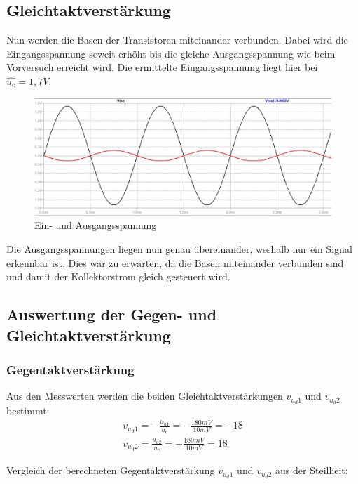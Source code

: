 \documentclass{article}
\begin{document}
\subsection{Gleichtaktverstärkung}
Nun werden die Basen der Transistoren miteinander verbunden. Dabei wird die Eingangsspannung soweit erhöht bis die gleiche Ausgangsspannung wie beim Vorversuch erreicht wird.
Die ermittelte Eingangsspannung liegt hier bei $\hat{u_e} = 1,7V$.

\begin{figure}[h]
  \begin{center}
    \includegraphics[scale=0.5]{../assets/images/EL2P1/Messung 3.2.JPG}
    \caption{Ein- und Ausgangsspannung}
  \end{center}
\end{figure}

Die Ausgangsspannungen liegen nun genau übereinander, weshalb nur ein Signal erkennbar ist. Dies war zu erwarten, da die Basen miteinander
verbunden sind und damit der Kollektorstrom gleich gesteuert wird.

\subsection{Auswertung der Gegen- und Gleichtaktverstärkung}
\subsubsection{Gegentaktverstärkung}

Aus den Messwerten werden die beiden Gleichtaktverstärkungen $v_{u_d1}$ und $v_{u_d2}$ bestimmt:
\begin{align*}
  v_{u_d1} = -\frac{u_{a1}}{u_e} = -\frac{180mV}{10mV} = -18\\
  v_{u_d2} = \frac{u_{a2}}{u_e} = -\frac{180mV}{10mV} = 18
\end{align*}


Vergleich der berechneten Gegentaktverstärkung $v_{u_d1}$ und $v_{u_d2}$ aus der Steilheit:
\end{document}
